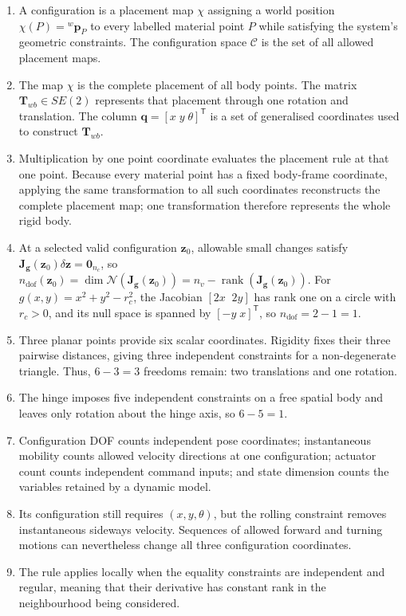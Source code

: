 \documentclass[
  australian,
  12pt,
  letterpaper,
  DIV=11,
  numbers=noendperiod,
  twoside]{scrreprt}
\providecommand{\tightlist}{%
  \setlength{\itemsep}{0pt}\setlength{\parskip}{0pt}}
\begin{document}
\begin{enumerate}
\def\labelenumi{\arabic{enumi}.}
\tightlist
\item
  A configuration is a placement map \(\chi\) assigning a world position
  \(\chi(P)={}^{w}\mathbf p_P\) to every labelled material point \(P\)
  while satisfying the system's geometric constraints. The configuration
  space \(\mathcal C\) is the set of all allowed placement maps.
\item
  The map \(\chi\) is the complete placement of all body points. The
  matrix \(\mathbf T_{wb}\in SE(2)\) represents that placement through
  one rotation and translation. The column
  \(\mathbf q=[x\;y\;\theta]^\mathsf T\) is a set of generalised
  coordinates used to construct \(\mathbf T_{wb}\).
\item
  Multiplication by one point coordinate evaluates the placement rule at
  that one point. Because every material point has a fixed body-frame
  coordinate, applying the same transformation to all such coordinates
  reconstructs the complete placement map; one transformation therefore
  represents the whole rigid body.
\item
  At a selected valid configuration \(\mathbf z_0\), allowable small
  changes satisfy
  \(\mathbf J_{\mathbf g}(\mathbf z_0)\delta\mathbf z=\mathbf 0_{n_c}\),
  so
  \(n_{\mathrm{dof}}(\mathbf z_0)=\dim\mathcal N(\mathbf J_{\mathbf g}(\mathbf z_0))=n_v-\operatorname{rank}(\mathbf J_{\mathbf g}(\mathbf z_0))\).
  For \(g(x,y)=x^2+y^2-r_c^2\), the Jacobian \([2x\;\;2y]\) has rank one
  on a circle with \(r_c>0\), and its null space is spanned by
  \([-y\;x]^\mathsf T\), so \(n_{\mathrm{dof}}=2-1=1\).
\item
  Three planar points provide six scalar coordinates. Rigidity fixes
  their three pairwise distances, giving three independent constraints
  for a non-degenerate triangle. Thus, \(6-3=3\) freedoms remain: two
  translations and one rotation.
\item
  The hinge imposes five independent constraints on a free spatial body
  and leaves only rotation about the hinge axis, so \(6-5=1\).
\item
  Configuration DOF counts independent pose coordinates; instantaneous
  mobility counts allowed velocity directions at one configuration;
  actuator count counts independent command inputs; and state dimension
  counts the variables retained by a dynamic model.
\item
  Its configuration still requires \((x,y,\theta)\), but the rolling
  constraint removes instantaneous sideways velocity. Sequences of
  allowed forward and turning motions can nevertheless change all three
  configuration coordinates.
\item
  The rule applies locally when the equality constraints are independent
  and regular, meaning that their derivative has constant rank in the
  neighbourhood being considered.
\end{enumerate}
\end{document}
